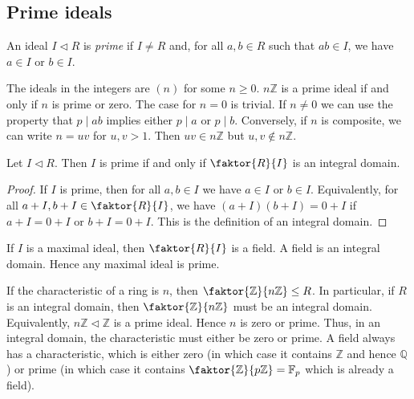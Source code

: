 \subsection{Prime ideals}
\begin{definition}
	An ideal \( I \triangleleft R \) is \textit{prime} if \( I \neq R \) and, for all \( a,b \in R \) such that \( ab \in I \), we have \( a \in I \) or \( b \in I \).
\end{definition}
\begin{example}
	The ideals in the integers are \( (n) \) for some \( n \geq 0 \).
	\( n\mathbb Z \) is a prime ideal if and only if \( n \) is prime or zero.
	The case for \( n = 0 \) is trivial.
	If \( n \neq 0 \) we can use the property that \( p \mid ab \) implies either \( p \mid a \) or \( p \mid b \).
	Conversely, if \( n \) is composite, we can write \( n = uv \) for \( u, v > 1 \).
	Then \( uv \in n\mathbb Z \) but \( u,v \not\in n\mathbb Z \).
\end{example}
\begin{proposition}
	Let \( I \triangleleft R \).
	Then \( I \) is prime if and only if \( \faktor{R}{I} \) is an integral domain.
\end{proposition}
\begin{proof}
	If \( I \) is prime, then for all \( a,b \in I \) we have \( a \in I \) or \( b \in I \).
	Equivalently, for all \( a + I, b + I \in \faktor{R}{I} \), we have \( (a+I)(b+I) = 0+I \) if \( a+I = 0+I \) or \( b+I = 0+I \).
	This is the definition of an integral domain.
\end{proof}
\begin{remark}
	If \( I \) is a maximal ideal, then \( \faktor{R}{I} \) is a field.
	A field is an integral domain.
	Hence any maximal ideal is prime.
\end{remark}
\begin{remark}
	If the characteristic of a ring is \( n \), then \( \faktor{\mathbb Z}{n\mathbb Z} \leq R \).
	In particular, if \( R \) is an integral domain, then \( \faktor{\mathbb Z}{n\mathbb Z} \) must be an integral domain.
	Equivalently, \( n\mathbb Z \triangleleft \mathbb Z \) is a prime ideal.
	Hence \( n \) is zero or prime.
	Thus, in an integral domain, the characteristic must either be zero or prime.
	A field always has a characteristic, which is either zero (in which case it contains \( \mathbb Z \) and hence \( \mathbb Q \)) or prime (in which case it contains \( \faktor{\mathbb Z}{p\mathbb Z} = \mathbb F_p \) which is already a field).
\end{remark}

